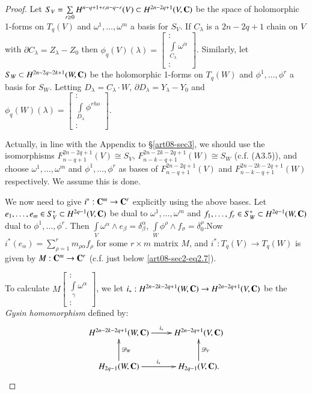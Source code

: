 \begin{proof}
Let $S_{V}=\sum\limits_{r\geq 0}H^{n-q+1+r,n-q-r}(V)\subset H^{2n-2q+1}(V,\mathbf{C})$ be the space of holomorphic 1-forms on $T_{q}(V)$ and $\omega^{1},\ldots,\omega^{m}$ a basis for $S_{V}$. If $C_{\lambda}$ is a $2n-2q+1$ chain on $V$ with $\partial C_{\lambda}=Z_{\lambda}-Z_{0}$ then $\phi_{q}(V)(\lambda)=\left[\begin{smallmatrix} :\\ \int\limits_{C_{\lambda}}\omega^{\alpha}\\ :\end{smallmatrix}\right]$. Similarly, let $S_{W}\subset H^{2n-2q-2k+1}(W,\mathbf{C})$ be the holomorphic 1-forms on $T_{q}(W)$ and $\phi^{1},\ldots,\phi^{r}$ a basis for $S_{W}$. Letting $D_{\lambda}=C_{\lambda}\cdot W$, $\partial D_{\lambda}=Y_{\lambda}-Y_{0}$ and $\phi_{q}(W)(\lambda)=\left[\begin{smallmatrix} :\\ \int\limits_{D_{\lambda}}\phi^{rho}\\ :\end{smallmatrix}\right]$.

Actually, in line with the Appendix to \S\ref{art08-sec3}, we should use the isomorphisms $F^{2n-2q+1}_{n-q+1}(V)\cong S_{V}$, $F^{2n-2k-2q+1}_{n-k-q+1}(W)\cong S_{W}$ (c.f. (A3.5)), and choose $\omega^{1},\ldots,\omega^{m}$ and $\phi^{1},\ldots,\phi^{r}$ as bases of $F^{2n-2q+1}_{n-q+1}(V)$ and $F^{2n-2k-2q+1}_{n-k-q+1}(W)$ respectively. We assume this is done.

We now need to give $i^{*}:\mathbf{C}^{m}\to \mathbf{C}^{r}$ explicitly using the above bases. Let $e_{1},\ldots,e_{m}\in S^{*}_{V}\subset H^{2q-1}(V,\mathbf{C})$ be dual to $\omega^{1},\ldots,\omega^{m}$ and $f_{1},\ldots,f_{r}\in S^{*}_{W}\subset H^{2q-1}(W,\mathbf{C})$ dual to $\phi^{1},\ldots,\phi^{r}$. Then $\int\limits_{V}\omega^{\alpha}\wedge e_{\beta}=\delta^{\alpha}_{\beta}$, $\int\limits_{W}\phi^{\rho}\wedge f_{\sigma}=\delta^{\rho}_{0}$.\pageoriginale Now $i^{*}(e_{\alpha})=\sum\limits^{r}_{\rho=1}m_{\rho\alpha}f_{\rho}$ for some $r\times m$ matrix $M$, and $i^{*}:T_{q}(V)\to T_{q}(W)$ is given by $M:\mathbf{C}^{m}\to \mathbf{C}^{r}$ (c.f. just below \eqref{art08-sec2-eq2.7}).

To calculate $M\left[\begin{smallmatrix} : \\ \int\limits_{\gamma}\omega^{\alpha}\\ :\end{smallmatrix}\right]$, we let $i_{*}:H^{2n-2k-2q+1}(W,\mathbf{C})\to H^{2n-2q+1}(V,\mathbf{C})$ be the {\em Gysin homomorphism} defined by:
\begin{equation}
\vcenter{\xymatrix{
H^{2n-2k-2q+1}(W,\bfC)\ar[r]^-{i_{*}} & H^{2n-2q+1}(V,\bfC)\\
H_{2q-1}(W,\bfC)\ar[u]_{\mathscr{D}_{W}}\ar[r]^-{i_{*}} & H_{2q-1}(V,\bfC).\ar[u]_{\mathscr{D}_{V}}
}}\label{art08-sec4-eq4.3}
\end{equation}


\end{proof}
